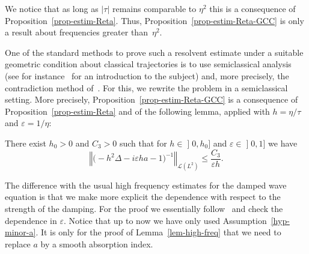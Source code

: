 \documentclass[AHL,Unicode,longabstracts]{cedram}
\newcommand{\abs}[1]{\left\vert #1\right\vert}
\newcommand{\nr}[1]{\left\Vert #1\right\Vert}
\renewcommand{\leq}{\leqslant}
\newcommand{\inv}{^{-1}}
\newcommand{\1}{\mathds 1}
\newcommand{\D}{\Delta}
\newcommand{\e}{\varepsilon}
\renewcommand{\t}{\tau}
\newcommand{\Lc}{{\mathcal L}}
\begin{document}
We notice that as long as $\abs \t$ remains comparable to $\eta^2$ this is a consequence of Proposition~\ref{prop-estim-Reta}. Thus, Proposition~\ref{prop-estim-Reta-GCC} is only a result about frequencies greater than~$\eta^2$.

One of the standard methods to prove such a resolvent estimate under a suitable geometric condition about classical trajectories is to use semiclassical analysis (see for instance~\cite{zworski} for an introduction to the subject) and, more precisely, the contradiction method of~\cite{Lebeau96}. For this, we rewrite the problem in a semiclassical setting. More precisely, Proposition~\ref{prop-estim-Reta-GCC} is a consequence of Proposition~\ref{prop-estim-Reta} and of the following lemma, applied with $h = \eta / \t$ and $\e = 1/\eta$:

\begin{lemm}\label{lem-high-freq}
There exist $h_0 > 0$ and $C_3 > 0$ such that for $h \in\mathopen{]}0,h_0]$ and $\e \in\mathopen{]}0,1]$ we have
\[
\nr{\big(-h^2 \D - i \e h a - 1 \big) \inv}_{\Lc(L^2)} \leq \frac {C_3} {\e h}.
\]
\end{lemm}

The difference with the usual high frequency estimates for the damped wave equation is that we make more explicit the dependence with respect to the strength of the damping. For the proof we essentially follow~\cite{BurqJo} and check the dependence in $\e$. Notice that up to now we have only used Assumption~\eqref{hyp-minor-a}. It is only for the proof of Lemma~\ref{lem-high-freq} that we need to replace $a$ by a smooth absorption index.
\end{document}
